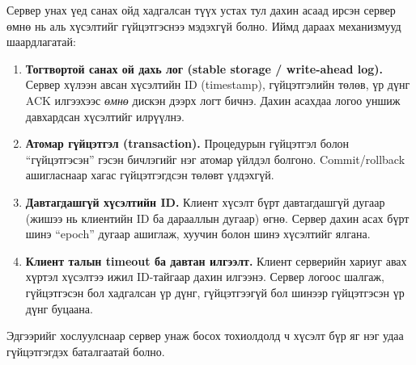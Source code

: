 \documentclass[12pt,a4paper]{article}
\begin{document}
Сервер унах үед санах ойд хадгалсан түүх устах тул дахин асаад ирсэн сервер өмнө нь аль хүсэлтийг гүйцэтгэснээ мэдэхгүй болно. Иймд дараах механизмууд шаардлагатай:
\begin{enumerate}[leftmargin=1.5em]
  \item \textbf{Тогтвортой санах ой дахь лог (stable storage / write-ahead log).} Сервер хүлээн авсан хүсэлтийн ID (timestamp), гүйцэтгэлийн төлөв, үр дүнг ACK илгээхээс \emph{өмнө} дискэн дээрх логт бичнэ. Дахин асахдаа логоо уншиж давхардсан хүсэлтийг илрүүлнэ.
  \item \textbf{Атомар гүйцэтгэл (transaction).} Процедурын гүйцэтгэл болон “гүйцэтгэсэн” гэсэн бичлэгийг нэг атомар үйлдэл болгоно. Commit/rollback ашигласнаар хагас гүйцэтгэгдсэн төлөвт үлдэхгүй.
  \item \textbf{Давтагдашгүй хүсэлтийн ID.} Клиент хүсэлт бүрт давтагдашгүй дугаар (жишээ нь клиентийн ID ба дарааллын дугаар) өгнө. Сервер дахин асах бүрт шинэ “epoch” дугаар ашиглаж, хуучин болон шинэ хүсэлтийг ялгана.
  \item \textbf{Клиент талын timeout ба давтан илгээлт.} Клиент серверийн хариуг авах хүртэл хүсэлтээ ижил ID-тайгаар дахин илгээнэ. Сервер логоос шалгаж, гүйцэтгэсэн бол хадгалсан үр дүнг, гүйцэтгээгүй бол шинээр гүйцэтгэсэн үр дүнг буцаана.
\end{enumerate}

Эдгээрийг хослуулснаар сервер унаж босох тохиолдолд ч хүсэлт бүр яг нэг удаа гүйцэтгэгдэх баталгаатай болно.
\end{document}
